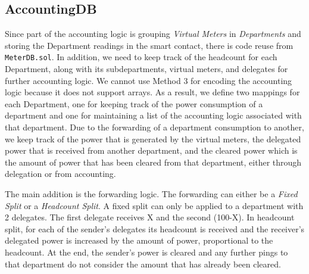 
\subsection{AccountingDB}

Since part of the accounting logic is grouping \textit{Virtual Meters} in \textit{Departments} and storing the Department readings in the smart contact, there is code reuse from \texttt{MeterDB.sol}. In addition, we need to keep track of the headcount for each Department, along with its subdepartments, virtual meters, and delegates for further accounting logic. We cannot use Method 3 for encoding the accounting logic because it does not support arrays. As a result, we define two mappings for each Department, one for keeping track of the power consumption of a department and one for maintaining a list of the accounting logic associated with that department. Due to the forwarding of a department consumption to another, we keep track of the power that is generated by the virtual meters, the delegated power that is received from another department, and the cleared power which is the amount of power that has been cleared from that department, either through delegation or from accounting. 

The main addition is the forwarding logic. The forwarding can either be a \textit{Fixed Split} or a \textit{Headcount Split}. A fixed split can only be applied to a department with 2 delegates. The first delegate receives X and the second (100-X). In headcount split, for each of the sender's delegates its headcount is received and the receiver's delegated power is increased by the amount of power, proportional to the headcount. At the end, the sender's power is cleared and any further pings to that department do not consider the amount that has already been cleared. 



